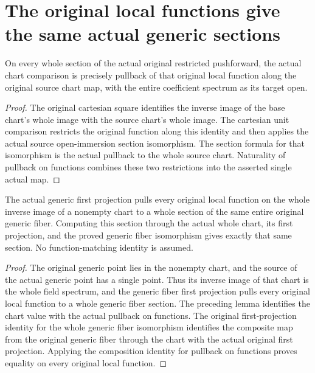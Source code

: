 \section{The original local functions give the same actual generic sections}

\begin{lemma}
\label{lem:kn-structure-trace-chart-function-readback}
\leanok
On every whole section of the actual original restricted pushforward,
the actual chart comparison is precisely pullback of that original
local function along the original source chart map, with the entire
coefficient spectrum as its target open.
\end{lemma}
\begin{proof}
The original cartesian square identifies the inverse image of the
base chart's whole image with the source chart's whole image. The
cartesian unit comparison restricts the original function along this
identity and then applies the actual source open-immersion section
isomorphism. The section formula for that isomorphism is the actual
pullback to the whole source chart. Naturality of pullback on functions
combines these two restrictions into the asserted single actual map.
\end{proof}

\begin{lemma}
\label{lem:kn-structure-trace-original-generic-section}
\leanok
The actual generic first projection pulls every original local function
on the whole inverse image of a nonempty chart to a whole section of
the same entire original generic fiber. Computing this section through
the actual whole chart, its first projection, and the proved generic
fiber isomorphism gives exactly that same section. No function-matching
identity is assumed.
\end{lemma}
\begin{proof}
The original generic point lies in the nonempty chart, and the source
of the actual generic point has a single point. Thus its inverse image
of that chart is the whole field spectrum, and the generic fiber first
projection pulls every original local function to a whole generic
fiber section. The preceding lemma identifies the chart value with
the actual pullback on functions. The original first-projection identity
for the whole generic fiber isomorphism identifies the composite map
from the original generic fiber through the chart with the actual
original first projection. Applying the composition identity for
pullback on functions proves equality on every original local function.
\end{proof}

